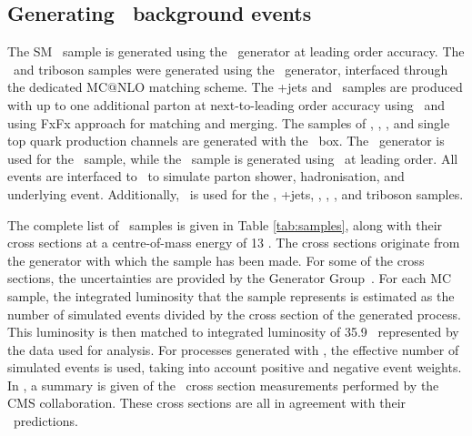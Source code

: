 \newpage
\subsection{Generating \SM\  background events}

The SM \tZq\ sample is generated using the \aMCMG\ generator at leading order accuracy. The \ttZ\ and triboson samples were generated using the \aMCMG\ generator, interfaced through the dedicated MC${@}$NLO matching scheme. The \WZ+jets and \ttW\ samples are produced with up to one additional parton at next-to-leading order accuracy using \aMCMG\ and using FxFx approach for matching and merging. The samples of \ttH, \WW, \ZZ,  and single top quark  production channels are generated with the \Powheg\ box. The \JHU\ generator is used for the \tqH\ sample, while the \tWZ\ sample is generated using \aMCMG\ at leading order. All events are interfaced to \Pythia\ to simulate parton shower, hadronisation, and underlying event. Additionally, \MS\ is used for the \tZq, \WZ+jets, \ttZ, \ttW, \tWZ, and triboson samples.



The complete list of \SM\ samples is given in Table \ref{tab:samples}, along with their cross sections at a centre-of-mass energy of 13 \TeV. The cross sections originate from the generator with which the sample has been made. For some of the cross sections,  the uncertainties are provided by the Generator Group~\cite{generator}. For each MC sample, the integrated luminosity that the sample represents is estimated as the number of simulated events divided by the cross section of the generated process. This luminosity is then matched to integrated luminosity of 35.9 \fbinv\ represented by the data used for analysis.  For processes generated with \aMCMG, the effective number of simulated events is used, taking into account positive and negative event weights. %
In , a summary is given of the \SM\ cross section measurements performed by the CMS collaboration. These cross sections are all in agreement with their \SM\ predictions. 

